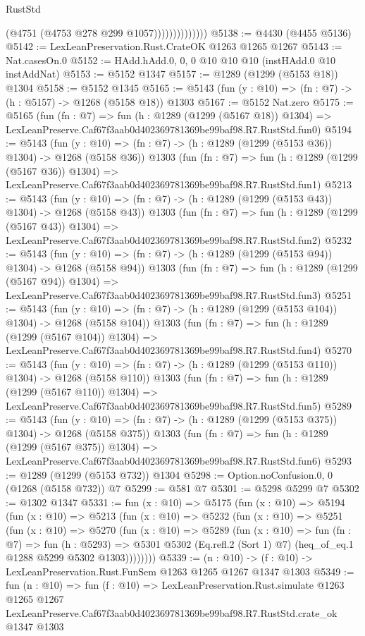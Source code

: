 \begin{lexlean}{RustStd}
\begin{coremodule}
                            (@4751 (@4753 @278 @299 @1057))))))))))))))
@5138 := @4430 (@4455 @5136)
@5142 := LexLeanPreservation.Rust.CrateOK @1263 @1265 @1267
@5143 := Nat.casesOn.{0}
@5152 := HAdd.hAdd.{0, 0, 0} @10 @10 @10 (instHAdd.{0} @10 instAddNat)
@5153 := @5152 @1347
@5157 := @1289 (@1299 (@5153 @18)) @1304
@5158 := @5152 @1345
@5165 := @5143 (fun (y : @10) => (fn : @7) -> (h : @5157) -> @1268 (@5158 @18)) @1303
@5167 := @5152 Nat.zero
@5175 := @5165
    (fun (fn : @7) =>
    fun (h : @1289 (@1299 (@5167 @18)) @1304) =>
    LexLeanPreserve.Caf67f3aab0d402369781369be99baf98.R7.RustStd.fun0)
@5194 := @5143
    (fun (y : @10) => (fn : @7) -> (h : @1289 (@1299 (@5153 @36)) @1304) -> @1268 (@5158 @36))
    @1303
    (fun (fn : @7) =>
    fun (h : @1289 (@1299 (@5167 @36)) @1304) =>
    LexLeanPreserve.Caf67f3aab0d402369781369be99baf98.R7.RustStd.fun1)
@5213 := @5143
    (fun (y : @10) => (fn : @7) -> (h : @1289 (@1299 (@5153 @43)) @1304) -> @1268 (@5158 @43))
    @1303
    (fun (fn : @7) =>
    fun (h : @1289 (@1299 (@5167 @43)) @1304) =>
    LexLeanPreserve.Caf67f3aab0d402369781369be99baf98.R7.RustStd.fun2)
@5232 := @5143
    (fun (y : @10) => (fn : @7) -> (h : @1289 (@1299 (@5153 @94)) @1304) -> @1268 (@5158 @94))
    @1303
    (fun (fn : @7) =>
    fun (h : @1289 (@1299 (@5167 @94)) @1304) =>
    LexLeanPreserve.Caf67f3aab0d402369781369be99baf98.R7.RustStd.fun3)
@5251 := @5143
    (fun (y : @10) => (fn : @7) -> (h : @1289 (@1299 (@5153 @104)) @1304) -> @1268 (@5158 @104))
    @1303
    (fun (fn : @7) =>
    fun (h : @1289 (@1299 (@5167 @104)) @1304) =>
    LexLeanPreserve.Caf67f3aab0d402369781369be99baf98.R7.RustStd.fun4)
@5270 := @5143
    (fun (y : @10) => (fn : @7) -> (h : @1289 (@1299 (@5153 @110)) @1304) -> @1268 (@5158 @110))
    @1303
    (fun (fn : @7) =>
    fun (h : @1289 (@1299 (@5167 @110)) @1304) =>
    LexLeanPreserve.Caf67f3aab0d402369781369be99baf98.R7.RustStd.fun5)
@5289 := @5143
    (fun (y : @10) => (fn : @7) -> (h : @1289 (@1299 (@5153 @375)) @1304) -> @1268 (@5158 @375))
    @1303
    (fun (fn : @7) =>
    fun (h : @1289 (@1299 (@5167 @375)) @1304) =>
    LexLeanPreserve.Caf67f3aab0d402369781369be99baf98.R7.RustStd.fun6)
@5293 := @1289 (@1299 (@5153 @732)) @1304
@5298 := Option.noConfusion.{0, 0} (@1268 (@5158 @732)) @7
@5299 := @581 @7
@5301 := @5298 @5299 @7
@5302 := @1302 @1347
@5331 := fun (x : @10) =>
  @5175
    (fun (x : @10) =>
    @5194
      (fun (x : @10) =>
      @5213
        (fun (x : @10) =>
        @5232
          (fun (x : @10) =>
          @5251
            (fun (x : @10) =>
            @5270
              (fun (x : @10) =>
              @5289
                (fun (x : @10) =>
                fun (fn : @7) =>
                fun (h : @5293) =>
                @5301 @5302 (Eq.refl.{2} (Sort 1) @7) (heq_of_eq.{1} @1288 @5299 @5302 @1303))))))))
@5339 := (n : @10) -> (f : @10) -> LexLeanPreservation.Rust.FunSem @1263 @1265 @1267 @1347 @1303
@5349 := fun (n : @10) =>
  fun (f : @10) =>
  LexLeanPreservation.Rust.simulate
    @1263
    @1265
    @1267
    LexLeanPreserve.Caf67f3aab0d402369781369be99baf98.R7.RustStd.crate_ok
    @1347
    @1303
\end{coremodule}
\end{lexlean}
